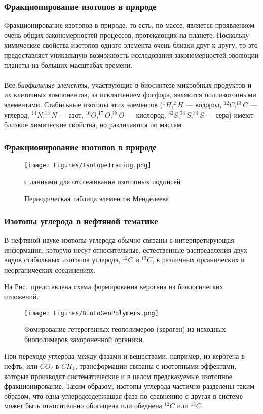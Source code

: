 \begin{frame}
\frametitle{Фракционирование изотопов в природе}
{\small
Фракционирование изотопов в природе, то есть, по массе, является проявлением очень общих закономерностей процессов, протекающих на планете. Поскольку химические свойства изотопов одного элемента очень близки друг к другу, то это предоставляет уникальную возможность исследования закономерностей эволюции планеты на больших масштабах времени.\\
~\\
Все \emph{биофильные элементы}, участвующие в биосинтезе микробных продуктов и их клеточных компонентов, за исключением фосфора, являются полиизотопными элементами. Стабильные изотопы этих элементов ($^1H, ^2H$ --- водород, $^{12}C, ^{13}C$ --- углерод, $^{14}N, ^{15}N$ --- азот, $^{16}O, ^{17}O, ^{18}O $ --- кислород, $^{32}S, ^{33}S, ^{34}S$ --- сера) имеют близкие химические свойства, но различаются по массам.
}

\end{frame}

\begin{frame}
\frametitle{Фракционирование изотопов в природе}

\begin{figure}[ht] 
	\centering\small
	\unitlength=1mm
	{\texttt{[image: Figures/IsotopeTracing.png]}} 
	\caption{Периодическая таблица элементов Менделеева} с данными для отслеживания изотопных подписей
	\label{f:IsotopeTracers}
\end{figure}
\end{frame}

\begin{frame}
\frametitle{Изотопы углерода в нефтяной тематике}
В нефтяной науке изотопы углерода обычно связаны с
интерпретирующая информация, которую несут относительные, естественные распределения
двух видов стабильных изотопов углерода, $^{12}C$ и $^{13}C$, в различных органических и неорганических соединениях.

На Рис.~представлена схема формирования керогена из биологических отложений. 

\begin{figure}[h]
	\centering
	\texttt{[image: Figures/BiotoGeoPolymers.png]}
	\caption{Фомирование гетерогенных геополимеров (кероген)
		из исходных биополимеров захороненной органики.}
	\label{fig:BiotoGeoPolymers}
\end{figure}

При переходе углерода между фазами и веществами, например, из керогена 
в нефть, или $CO_2$ в $CH_4$, трансформации связаны с изотопными
эффектами, которые производят систематические и в целом предсказуемые
изотопное фракционирование. 
Таким образом, изотопы углерода частично
разделены таким образом, что одна углеродсодержащая фаза по сравнению с
другая в системе может быть относительно обогащена или обеднена
$^{12}C$ или $^{13}C$.

\end{frame}

